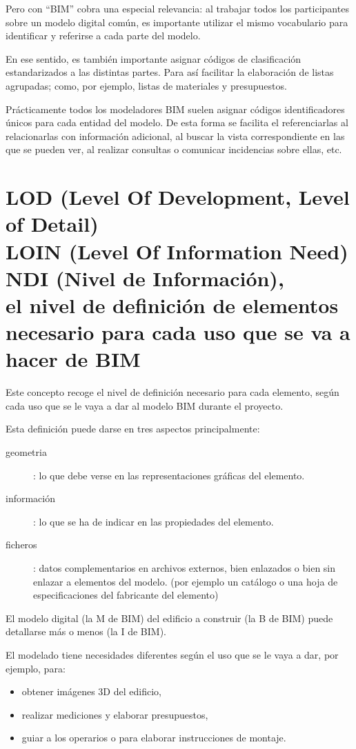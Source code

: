 \documentclass[spanish,12pt,a4paper,final,oneside]{book}
\begin{document}
Pero con ``BIM'' cobra una especial relevancia: al trabajar todos los participantes sobre un modelo digital común,  es importante utilizar el mismo vocabulario para identificar y referirse a cada parte del modelo.

En ese sentido, es también importante asignar códigos de clasificación estandarizados a las distintas partes. Para así facilitar la elaboración de listas agrupadas; como, por ejemplo, listas de materiales y presupuestos.

Prácticamente todos los modeladores BIM suelen asignar códigos identificadores únicos para cada entidad del modelo. De esta forma se facilita el referenciarlas al relacionarlas con información adicional, al buscar la vista correspondiente en las que se pueden ver, al realizar consultas o comunicar incidencias sobre ellas, etc.


\section{LOD (Level Of Development, Level of Detail)\\LOIN (Level Of Information Need)\\NDI (Nivel de Información),\\el nivel de definición de elementos necesario para cada uso que se va a hacer de BIM}
Este concepto recoge el nivel de definición necesario para cada elemento, según cada uso que se le vaya a dar al modelo BIM durante el proyecto.

Esta definición puede darse en tres aspectos principalmente:
\begin{description}
\item[geometria]: lo que debe verse en las representaciones gráficas del elemento.
\item[información]: lo que se ha de indicar en las propiedades del elemento.
\item[ficheros]: datos complementarios en archivos externos, bien enlazados o bien sin enlazar a elementos del modelo. (por ejemplo un catálogo o una hoja de especificaciones del fabricante del elemento) 
\end{description}

El modelo digital (la M de BIM) del edificio a construir (la B de BIM) puede detallarse más o menos (la I de BIM).

El modelado tiene necesidades diferentes según el uso que se le vaya a dar, por ejemplo, para:
\begin{itemize} 
\item obtener imágenes 3D del edificio, 
\item realizar mediciones y elaborar presupuestos, 
\item guiar a los operarios o para elaborar instrucciones de montaje.
\end{itemize} 
\end{document}
